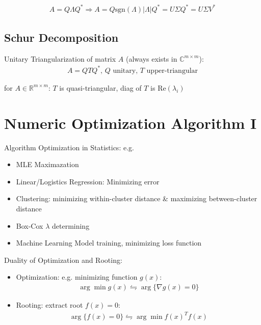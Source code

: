 \begin{align}
    A=Q\Lambda Q^*\Rightarrow  A=Q\mathrm{sgn}(\Lambda )|\Lambda |Q^*=U\Sigma Q^*=U\Sigma V^* 
\end{align}



\subsection{Schur Decomposition}
    Unitary Triangularization of matrix $ A $ (always exists in $ \mathbb{C}^{m\times m} $):
    \begin{align}
        A=QTQ^*,\, Q\text{ unitary, }T\text{ upper-triangular} 
    \end{align}
    
    for $ A\in\mathbb{R}^{m\times m} $: $ T $ is quasi-triangular, diag of $ T $ is $ \mathrm{Re} (\lambda _i) $
















\section{Numeric Optimization Algorithm I}

Algorithm Optimization in Statistics: e.g.
\begin{itemize}[topsep=2pt,itemsep=0pt]
    \item MLE Maximazation
    \item Linear/Logistics Regression: Minimizing error
    \item Clustering: minimizing within-cluster distance \& maximizing between-cluster distance
    \item Box-Cox $ \lambda  $ determining
    \item Machine Learning Model training, minimizing loss function
\end{itemize}

\begin{point}
Duality of Optimization and Rooting:
\end{point}

\begin{itemize}[topsep=2pt,itemsep=0pt]
    \item Optimization: e.g. minimizing function $ g(x) $:
    \begin{align}
        \arg\min g(x) \leftrightharpoons \arg\{\nabla g(x)=0\}
    \end{align}
    \item Rooting: extract root $ f(x)=0 $:
    \begin{align}
        \arg \{f(x)=0\}\leftrightharpoons \arg\min f(x)^Tf(x) 
    \end{align}   
\end{itemize}

